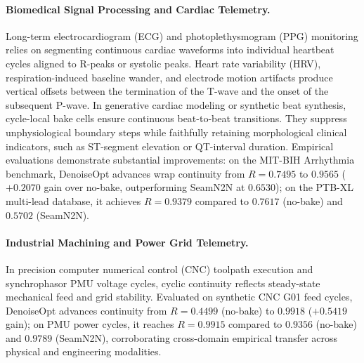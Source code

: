\paragraph{Biomedical Signal Processing and Cardiac Telemetry.}
Long-term electrocardiogram (ECG) and photoplethysmogram (PPG) monitoring relies on segmenting continuous cardiac waveforms into individual heartbeat cycles aligned to R-peaks or systolic peaks.
Heart rate variability (HRV), respiration-induced baseline wander, and electrode motion artifacts produce vertical offsets between the termination of the T-wave and the onset of the subsequent P-wave.
In generative cardiac modeling or synthetic beat synthesis, cycle-local bake cells ensure continuous beat-to-beat transitions.
They suppress unphysiological boundary steps while faithfully retaining morphological clinical indicators, such as ST-segment elevation or QT-interval duration.
Empirical evaluations demonstrate substantial improvements: on the MIT-BIH Arrhythmia benchmark, DenoiseOpt advances wrap continuity from $R = 0.7495$ to $\mathbf{0.9565}$ ($+0.2070$ gain over no-bake, outperforming SeamN2N at $0.6530$); on the PTB-XL multi-lead database, it achieves $R = \mathbf{0.9379}$ compared to $0.7617$ (no-bake) and $0.5702$ (SeamN2N).

\paragraph{Industrial Machining and Power Grid Telemetry.}
In precision computer numerical control (CNC) toolpath execution and synchrophasor PMU voltage cycles, cyclic continuity reflects steady-state mechanical feed and grid stability.
Evaluated on synthetic CNC G01 feed cycles, DenoiseOpt advances continuity from $R = 0.4499$ (no-bake) to $\mathbf{0.9918}$ ($+0.5419$ gain); on PMU power cycles, it reaches $R = \mathbf{0.9915}$ compared to $0.9356$ (no-bake) and $0.9789$ (SeamN2N), corroborating cross-domain empirical transfer across physical and engineering modalities.
